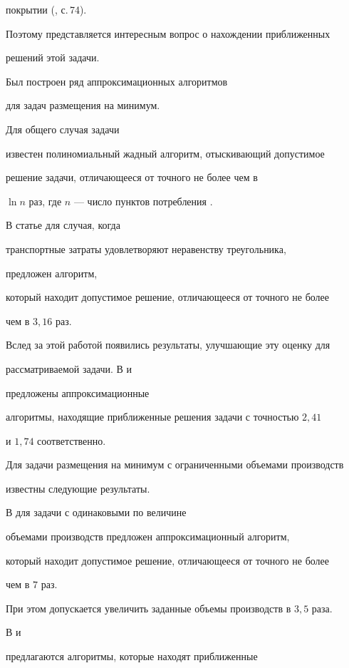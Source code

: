 покрытии (\cite{GD82}, с.\,74).


Поэтому представляется интересным вопрос о нахождении приближенных 


решений этой задачи.





Был построен ряд аппроксимационных алгоритмов 


для задач размещения на минимум.


Для общего случая задачи 


известен полиномиальный жадный алгоритм, отыскивающий допустимое 


решение задачи, отличающееся от точного не более чем в 


$\ln n$ раз, где $n$ --- число пунктов потребления \cite{H82}.


В статье \cite{STA97} для случая, когда


транспортные затраты удовлетворяют неравенству треугольника,


предложен алгоритм,


который находит допустимое решение, отличающееся от точного не более


чем в $3{,}16$ раз.


Вслед за этой работой появились результаты, улучшающие эту оценку для 


рассматриваемой задачи. В \cite{GK98} и 


\cite{C98} предложены аппроксимационные 


алгоритмы, находящие приближенные решения задачи с точностью $2{,}41$


и $1{,}74$ соответственно. 





Для задачи размещения на минимум с ограниченными объемами производств


известны следующие результаты. 


В \cite{STA97} для задачи с одинаковыми по величине 


объемами производств предложен аппроксимационный алгоритм,


который находит допустимое решение, отличающееся от точного не более


чем в $7$ раз.


При этом допускается увеличить заданные объемы производств в $3{,}5$ раза.


В \cite{KPR98} и


\cite{CW99} предлагаются алгоритмы, которые находят приближенные 


